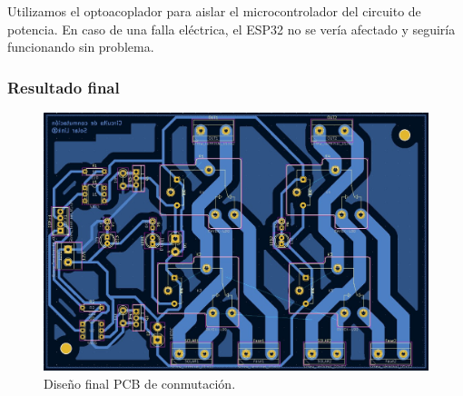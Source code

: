 Utilizamos el optoacoplador para aislar el microcontrolador del circuito de potencia. En caso de una falla eléctrica, el ESP32 no se vería afectado y seguiría funcionando sin problema.\\

\subsubsection{Resultado final}

\begin{figure}[H]
    \centering
    \includegraphics[width=1\linewidth]{hardware/Screenshot_18.jpg}
    \caption{Diseño final PCB de conmutación.}
    \label{fig:conmutacion-pcb}
\end{figure}

